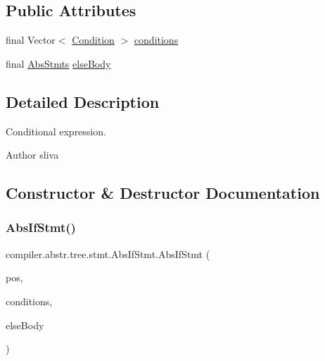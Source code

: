 \subsection*{Public Attributes}
\begin{DoxyCompactItemize}
\item 
final Vector$<$ \hyperlink{classcompiler_1_1abstr_1_1tree_1_1_condition}{Condition} $>$ \hyperlink{classcompiler_1_1abstr_1_1tree_1_1stmt_1_1_abs_if_stmt_ae0bcb1a3a7a2633718a6fae1e50c4d65}{conditions}
\item 
final \hyperlink{classcompiler_1_1abstr_1_1tree_1_1_abs_stmts}{Abs\+Stmts} \hyperlink{classcompiler_1_1abstr_1_1tree_1_1stmt_1_1_abs_if_stmt_a067f9cb00ae72b23eccd8e81413a1865}{else\+Body}
\end{DoxyCompactItemize}


\subsection{Detailed Description}
Conditional expression.

\begin{DoxyAuthor}{Author}
sliva 
\end{DoxyAuthor}


\subsection{Constructor \& Destructor Documentation}
\mbox{\label{classcompiler_1_1abstr_1_1tree_1_1stmt_1_1_abs_if_stmt_af68c09d1f84a735be7de041251f44acc}} 
\subsubsection{\texorpdfstring{Abs\+If\+Stmt()}{AbsIfStmt()}}
{\footnotesize\ttfamily compiler.\+abstr.\+tree.\+stmt.\+Abs\+If\+Stmt.\+Abs\+If\+Stmt (\begin{DoxyParamCaption}\item[{\hyperlink{classcompiler_1_1_position}{Position}}]{pos,  }\item[{Vector$<$ \hyperlink{classcompiler_1_1abstr_1_1tree_1_1_condition}{Condition} $>$}]{conditions,  }\item[{\hyperlink{classcompiler_1_1abstr_1_1tree_1_1_abs_stmts}{Abs\+Stmts}}]{else\+Body }\end{DoxyParamCaption})}

